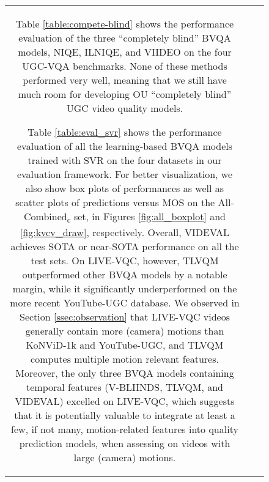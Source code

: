 \documentclass[journal]{IEEEtran}
\begin{document}
\begin{figure}[!t]
\begin{tabular}{ccc}
Table \ref{table:compete-blind} shows the performance evaluation of the three ``completely blind'' BVQA models, NIQE, ILNIQE, and VIIDEO on the four UGC-VQA benchmarks. None of these methods performed very well, meaning that we still have much room for developing OU ``completely blind'' UGC video quality models.

Table \ref{table:eval_svr} shows the performance evaluation of all the learning-based BVQA models trained with SVR on the four datasets in our evaluation framework. For better visualization, we also show box plots of performances as well as scatter plots of predictions versus MOS on the All-Combined\textsubscript{c} set, in Figures \ref{fig:all_boxplot} and \ref{fig:kvcv_draw}, respectively. Overall, VIDEVAL achieves SOTA or near-SOTA performance on all the test sets. On LIVE-VQC, however, TLVQM outperformed other BVQA models by a notable margin, while it significantly underperformed on the more recent YouTube-UGC database. We observed in Section \ref{ssec:observation} that LIVE-VQC videos generally contain more (camera) motions than KoNViD-1k and YouTube-UGC, and TLVQM computes multiple motion relevant features. Moreover, the only three BVQA models containing temporal features (V-BLIINDS, TLVQM, and VIDEVAL) excelled on LIVE-VQC, which suggests that it is potentially valuable to integrate at least a few, if not many, motion-related features into quality prediction models, when assessing on videos with large (camera) motions.


\end{tabular}
\end{figure}
\end{document}
